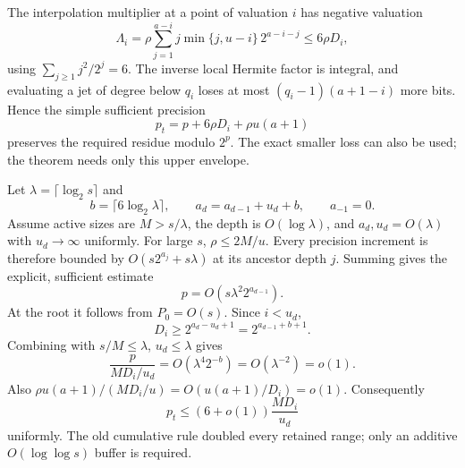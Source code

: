 \documentclass[11pt,letterpaper]{article}
\theoremstyle{remark}\newtheorem{remark}[theorem]{Remark}
\begin{document}
The interpolation multiplier at a point of valuation $i$ has negative
valuation
\[
 \Lambda_i=\rho\sum_{j=1}^{a-i}
 j\min\{j,u-i\}\,2^{a-i-j}\le6\rho D_i,
\]
using $\sum_{j\ge1}j^2/2^j=6$. The inverse local Hermite factor is
integral, and evaluating a jet of degree below $q_i$ loses at most
$(q_i-1)(a+1-i)$ more bits. Hence the simple sufficient precision
\begin{equation}\label{eq:working-precision}
 p_t=p+6\rho D_i+\rho u(a+1)
\end{equation}
preserves the required residue modulo $2^p$. The exact smaller loss can
also be used; the theorem needs only this upper envelope.

Let $\lambda=\lceil\log_2s\rceil$ and
\begin{equation}\label{eq:additive-buffer}
 b=\lceil6\log_2\lambda\rceil,
 \qquad a_d=a_{d-1}+u_d+b,\qquad a_{-1}=0.
\end{equation}
Assume active sizes are $M>s/\lambda$, the depth is $O(\log\lambda)$,
and $a_d,u_d=O(\lambda)$ with $u_d\to\infty$ uniformly. For large $s$,
$\rho\le2M/u$. Every precision increment is therefore bounded by
$O(s2^{a_j}+s\lambda)$ at its ancestor depth $j$. Summing gives the
explicit, sufficient estimate
\begin{equation}\label{eq:inherited}
 p=O(s\lambda^2 2^{a_{d-1}}).
\end{equation}
At the root it follows from $P_0=O(s)$.
Since $i<u_d$,
\[
 D_i\ge2^{a_d-u_d+1}=2^{a_{d-1}+b+1}.
\]
Combining with $s/M\le\lambda$, $u_d\le\lambda$ gives
\[
 \frac{p}{MD_i/u_d}=O(\lambda^4 2^{-b})=O(\lambda^{-2})=o(1).
\]
Also $\rho u(a+1)/(MD_i/u)=O(u(a+1)/D_i)=o(1)$.
Consequently
\begin{equation}\label{eq:sharp-precision}
 p_t\le(6+o(1))\frac{MD_i}{u_d}
\end{equation}
uniformly. The old cumulative rule doubled every retained range;
only an additive $O(\log\log s)$ buffer is required.
\end{document}
